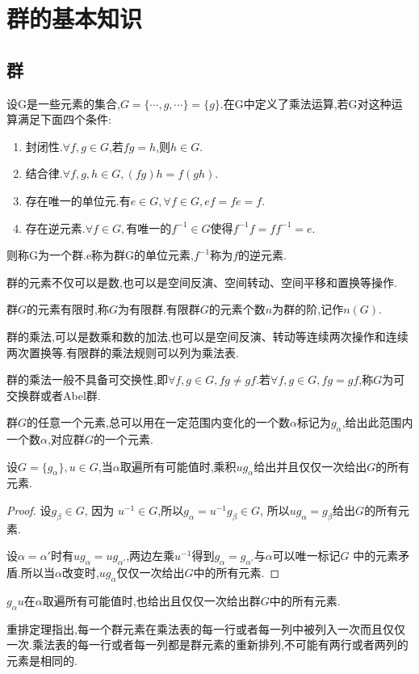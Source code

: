 \chapter{群的基本知识}
\section{群}
\begin{definition}[群]
设G是一些元素的集合,$G=\{\cdots,g,\cdots\}=\{g\}$.在G中定义了乘法运算,若G对这种运算满足下面四个条件:
\begin{enumerate}
    \item 封闭性.$\forall f,g \in G$,若$fg=h$,则$h \in G$.
    \item 结合律.$\forall f,g,h \in G,(fg)h=f(gh)$.
    \item 存在唯一的单位元.有$e \in G,\forall f \in G,ef=fe=f$.
    \item 存在逆元素.$\forall f\in G ,$有唯一的$f^{-1} \in G$使得$f^{-1}f=ff^{-1}=e$.
\end{enumerate}
则称G为一个群.e称为群G的单位元素,$f^{-1}$称为$f$的逆元素.
\end{definition}
群的元素不仅可以是数,也可以是空间反演、空间转动、空间平移和置换等操作.

群$G$的元素有限时,称$G$为有限群.有限群$G$的元素个数$n$为群的阶,记作$n(G)$.

群的乘法,可以是数乘和数的加法,也可以是空间反演、转动等连续两次操作和连续两次置换等.有限群的乘法规则可以列为乘法表.

群的乘法一般不具备可交换性,即$\forall f,g \in G,fg\neq gf$.若$\forall f,g \in G,fg=gf$,称$G$为可交换群或者Abel群.

群$G$的任意一个元素,总可以用在一定范围内变化的一个数$\alpha$标记为$g_\alpha$,给出此范围内一个数$\alpha$,对应群$G$的一个元素.
\begin{theorem}[重排定理]
设$G=\{g_\alpha\},u\in G$,当$\alpha$取遍所有可能值时,乘积$ug_\alpha$给出并且仅仅一次给出$G$的所有元素.
\end{theorem}
\begin{proof}
  设$g_\beta \in G$, 因为 $ u^{-1} \in G$,所以$ g_\alpha=u^{-1}g_\beta\in G$, 所以$ug_\alpha =g_\beta$给出$G$的所有元素.

  设$\alpha=\alpha'$时有$ug_\alpha=ug_{\alpha'}$,两边左乘$u^{-1}$得到$g_\alpha=g_{\alpha'}$与$\alpha$可以唯一标记$G$
中的元素矛盾.所以当$\alpha$改变时,$ug_\alpha$仅仅一次给出$G$中的所有元素.
\end{proof}
\begin{corollary}
    $g_\alpha u$在$\alpha$取遍所有可能值时,也给出且仅仅一次给出群$G$中的所有元素.
\end{corollary}
重排定理指出,每一个群元素在乘法表的每一行或者每一列中被列入一次而且仅仅一次.乘法表的每一行或者每一列都是群元素的重新排列,不可能有两行或者两列的元素是相同的.
